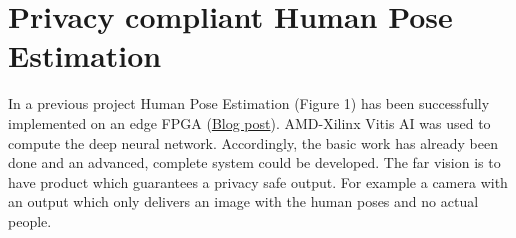 \documentclass[a4paper,12pt]{book}
\begin{document}
\section*{Privacy compliant Human Pose Estimation}

In a previous project Human Pose Estimation (Figure 1) has been successfully implemented on an edge FPGA (\href{https://www.hackster.io/michi_michi/hardware-accelerated-human-pose-estimation-kv260-ias-cam-d5ebb9}{Blog post}).
AMD-Xilinx Vitis AI was used to compute the deep neural network.
Accordingly, the basic work has already been done and an advanced, complete system could be developed.
The far vision is to have product which guarantees a privacy safe output.
For example a camera with an output which only delivers an image with the human poses and no actual people.
\end{document}
